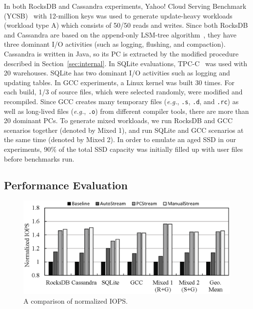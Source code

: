 In both RocksDB and Cassandra experiments, Yahoo! Cloud Serving Benchmark
(YCSB)~\cite{YCSB} with 12-million keys was used to generate update-heavy
workloads (workload type A) which consists of 50/50 reads and writes.  Since
both RocksDB and Cassandra are based on the append-only LSM-tree
algorithm~\cite{LSM}, they have three dominant I/O activities (such as logging,
flushing, and compaction).  Cassandra is written in Java, so its PC is
extracted by the modified procedure described in Section~\ref{sec:internal}.  In SQLite evaluations,
TPC-C~\cite{TPCC} was used with 20 warehouses.  SQLite has two dominant I/O
activities such as logging and updating tables.  In GCC experiments, a Linux
kernel was built 30 times.  For each build, 1/3 of source files, which were
selected randomly, were modified and recompiled.  Since GCC creates many
temporary files ({\it e.g.}, \texttt{.s}, \texttt{.d}, and \texttt{.rc}) as
well as long-lived files ({\it e.g.}, \texttt{.o}) from different compiler
tools, there are more than 20 dominant PCs.  To generate mixed workloads, we run
RocksDB and GCC scenarios together (denoted by Mixed 1), and run SQLite and GCC
scenarios at the same time (denoted by Mixed 2).  In order to emulate an aged
SSD in our experiments, 90\% of the total SSD capacity was initially filled up
with user files before benchmarks run.

\subsection{Performance Evaluation}

\begin{figure}[t]
	\centering
	\includegraphics[width=1\linewidth]{figure/pcstream/iops}
	\caption{A comparison of normalized IOPS.}
	\label{fig:iops}
\end{figure}

